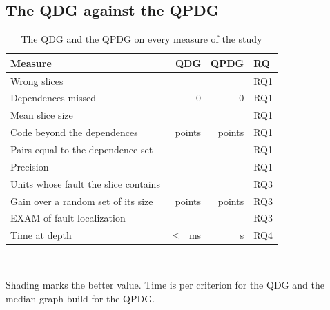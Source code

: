 \subsection{The QDG against the QPDG}\label{sec:qdgqpdg}

\begin{table}[t]
  \centering
  \caption{The QDG and the QPDG on every measure of the study}
  \label{tab:qdgqpdg}
  \footnotesize\setlength{\tabcolsep}{3pt}\renewcommand{\arraystretch}{1.12}
  \newcommand{\sep}{\arrayrulecolor{black!25}\hline\arrayrulecolor{black}}
  \newcommand{\win}{\cellcolor{blue!7}}
  \begin{tabular}{@{}>{\raggedright\arraybackslash}p{3.3cm} r r l@{}}
    \toprule
    \textbf{Measure} & \textbf{QDG} & \textbf{QPDG} & \textbf{RQ} \\
    \midrule
    Wrong slices & \numRqOneLcUnsound{} & \numRqOneYzUnsound{} & RQ1 \\ \sep
    Dependences missed & 0 & 0 & RQ1 \\ \sep
    Mean slice size & \win\numRqOneLcSize{} & \numRqOneYzSize{} & RQ1 \\ \sep
    Code beyond the dependences & \win\numLcExcess{} points & \numYzExcess{} points & RQ1 \\ \sep
    Pairs equal to the dependence set & \win\numNestDEqQdg{} & \numNestDEqQpdg{} & RQ1 \\ \sep
    Precision & \win\numRqOneLcPrecision{} & \numRqOneYzPrecision{} & RQ1 \\ \sep
    Units whose fault the slice contains & \numRqThreeContainLc{} & \win\numRqThreeContainYz{} & RQ3 \\ \sep
    Gain over a random set of its size & \win\numSizeCtlLcGain{} points & \numSizeCtlYzGain{} points & RQ3 \\ \sep
    EXAM of fault localization & \numMbflAllExamLc{} & \win\numMbflAllExamYz{} & RQ3 \\ \sep
    Time at depth \numCostMeasuredDepthOneSixty{} & \win$\leq$\,\numCostLcMaxCritMs{}~ms & \numCostBuildDepthOneSixty{}~s & RQ4 \\
    \bottomrule
  \end{tabular}\\[3pt]
  \begin{minipage}{\columnwidth}\footnotesize
  Shading marks the better value. Time is per criterion for the QDG and the median graph build for the QPDG.
  \end{minipage}
\end{table}

